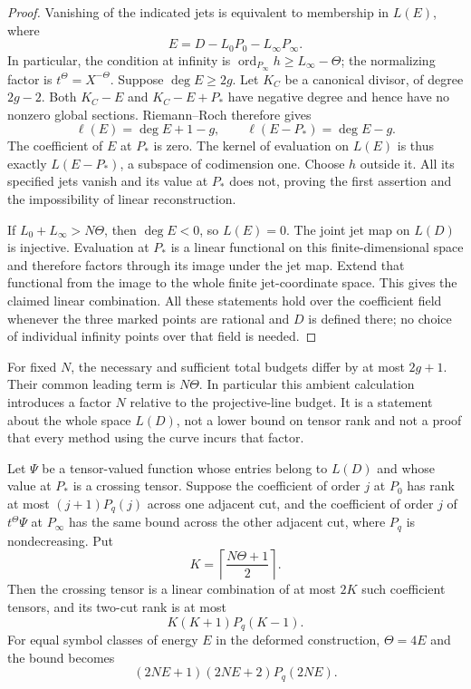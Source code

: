 \begin{proof}
Vanishing of the indicated jets is equivalent to membership
in $L(E)$, where
\[
 E=D-L_0P_0-L_\infty P_\infty.
\]
In particular, the condition at infinity is
$\operatorname{ord}_{P_\infty}h\geq L_\infty-\Theta$;
the normalizing factor is $t^\Theta=X^{-\Theta}$.
Suppose $\deg E\geq2g$. Let $K_C$ be a canonical divisor,
of degree $2g-2$. Both $K_C-E$ and $K_C-E+P_*$ have negative
degree and hence have no nonzero global sections.
Riemann--Roch \cite[Tag 0BS6]{StacksCurves} therefore gives
\[
 \ell(E)=\deg E+1-g,\qquad
 \ell(E-P_*)=\deg E-g.
\]
The coefficient of $E$ at $P_*$ is zero. The kernel of
evaluation on $L(E)$ is thus exactly $L(E-P_*)$, a subspace
of codimension one. Choose $h$ outside it. All its specified
jets vanish and its value at $P_*$ does not, proving the first
assertion and the impossibility of linear reconstruction.

If $L_0+L_\infty>N\Theta$, then $\deg E<0$, so $L(E)=0$.
The joint jet map on $L(D)$ is injective. Evaluation at $P_*$
is a linear functional on this finite-dimensional space and
therefore factors through its image under the jet map.
Extend that functional from the image to the whole finite
jet-coordinate space. This gives the claimed linear combination.
All these statements hold over the coefficient field whenever
the three marked points are rational and $D$ is defined there;
no choice of individual infinity points over that field is needed.
\end{proof}

For fixed $N$, the necessary and sufficient total budgets differ
by at most $2g+1$. Their common leading term is $N\Theta$.
In particular this ambient calculation introduces a factor $N$
relative to the projective-line budget. It is a statement about
the whole space $L(D)$, not a lower bound on tensor rank and
not a proof that every method using the curve incurs that factor.

\begin{corollary}
\label{cor:fermat-finite-cover}
Let $\Psi$ be a tensor-valued function whose entries belong to
$L(D)$ and whose value at $P_*$ is a crossing tensor.
Suppose the coefficient of order $j$ at $P_0$ has rank at most
$(j+1)P_q(j)$ across one adjacent cut, and the coefficient of
order $j$ of $t^\Theta\Psi$ at $P_\infty$ has the same bound
across the other adjacent cut, where $P_q$ is nondecreasing.
Put
\[
 K=\left\lceil\frac{N\Theta+1}{2}\right\rceil.
\]
Then the crossing tensor is a linear combination of at most
$2K$ such coefficient tensors, and its two-cut rank is at most
\[
 K(K+1)P_q(K-1).
\]
For equal symbol classes of energy $E$ in the deformed
construction, $\Theta=4E$ and the bound becomes
\[
 (2NE+1)(2NE+2)P_q(2NE).
\]
\end{corollary}

